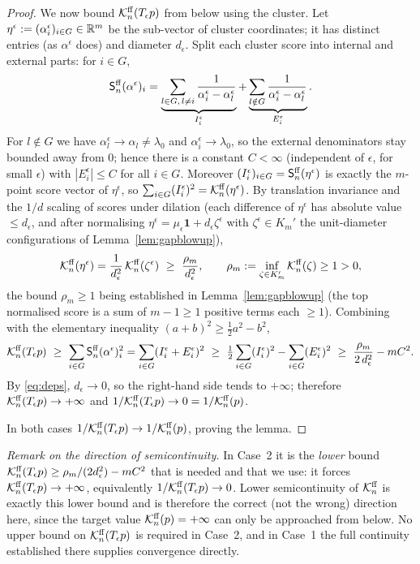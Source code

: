 \begin{proof}
We now bound $\mathcal{K}^{\mathrm{ff}}_n(T_\epsilon p)$ from below using the cluster. Let
$\eta^\epsilon:=(\alpha^\epsilon_i)_{i\in G}\in\mathbb{R}^m$ be the sub-vector of
cluster coordinates; it has distinct entries (as $\alpha^\epsilon$ does) and
diameter $d_\epsilon$. Split each cluster score into internal and external parts:
for $i\in G$,
\[
\mathsf{S}^{\mathrm{ff}}_n(\alpha^\epsilon)_i
=\underbrace{\sum_{l\in G,\,l\ne i}\frac1{\alpha^\epsilon_i-\alpha^\epsilon_l}}_{I^\epsilon_i}
+\underbrace{\sum_{l\notin G}\frac1{\alpha^\epsilon_i-\alpha^\epsilon_l}}_{E^\epsilon_i}.
\]
For $l\notin G$ we have $\alpha^\epsilon_l\to\alpha_l\ne\lambda_0$ and
$\alpha^\epsilon_i\to\lambda_0$, so the external denominators stay bounded away from
$0$; hence there is a constant $C<\infty$ (independent of $\epsilon$, for small
$\epsilon$) with $|E^\epsilon_i|\le C$ for all $i\in G$. Moreover
$(I^\epsilon_i)_{i\in G}=\mathsf{S}^{\mathrm{ff}}_n(\eta^\epsilon)$ is exactly the $m$-point score
vector of $\eta^\epsilon$, so $\sum_{i\in G}(I^\epsilon_i)^2=\mathcal{K}^{\mathrm{ff}}_n(\eta^\epsilon)$.
By translation invariance and the $1/d$ scaling of scores under dilation (each
difference of $\eta^\epsilon$ has absolute value $\le d_\epsilon$, and after
normalising $\eta^\epsilon=\mu_\epsilon\mathbf1+d_\epsilon\zeta^\epsilon$ with
$\zeta^\epsilon\in K_m'$ the unit-diameter configurations of
Lemma~\ref{lem:gapblowup}),
\[
\mathcal{K}^{\mathrm{ff}}_n(\eta^\epsilon)=\frac{1}{d_\epsilon^2}\,\mathcal{K}^{\mathrm{ff}}_n(\zeta^\epsilon)
\ \ge\ \frac{\rho_m}{d_\epsilon^2},\qquad \rho_m:=\inf_{\zeta\in K_m'}\mathcal{K}^{\mathrm{ff}}_n(\zeta)\ge1>0,
\]
the bound $\rho_m\ge1$ being established in Lemma~\ref{lem:gapblowup} (the top
normalised score is a sum of $m-1\ge1$ positive terms each $\ge1$). Combining with
the elementary inequality $(a+b)^2\ge\tfrac12a^2-b^2$,
\[
\mathcal{K}^{\mathrm{ff}}_n(T_\epsilon p)\ \ge\ \sum_{i\in G}\mathsf{S}^{\mathrm{ff}}_n(\alpha^\epsilon)_i^2
=\sum_{i\in G}(I^\epsilon_i+E^\epsilon_i)^2
\ \ge\ \tfrac12\sum_{i\in G}(I^\epsilon_i)^2-\sum_{i\in G}(E^\epsilon_i)^2
\ \ge\ \frac{\rho_m}{2\,d_\epsilon^2}-mC^2 .
\]
By \eqref{eq:deps}, $d_\epsilon\to0$, so the right-hand side tends to $+\infty$;
therefore $\mathcal{K}^{\mathrm{ff}}_n(T_\epsilon p)\to+\infty$ and
$1/\mathcal{K}^{\mathrm{ff}}_n(T_\epsilon p)\to0=1/\mathcal{K}^{\mathrm{ff}}_n(p)$.

\smallskip
In both cases $1/\mathcal{K}^{\mathrm{ff}}_n(T_\epsilon p)\to1/\mathcal{K}^{\mathrm{ff}}_n(p)$, proving the lemma.
\end{proof}

\noindent\emph{Remark on the direction of semicontinuity.} In Case~2 it is the
\emph{lower} bound $\mathcal{K}^{\mathrm{ff}}_n(T_\epsilon p)\ge\rho_m/(2d_\epsilon^2)-mC^2$ that is
needed and that we use: it forces $\mathcal{K}^{\mathrm{ff}}_n(T_\epsilon p)\to+\infty$, equivalently
$1/\mathcal{K}^{\mathrm{ff}}_n(T_\epsilon p)\to0$. Lower semicontinuity of $\mathcal{K}^{\mathrm{ff}}_n$ is exactly
this lower bound and is therefore the correct (not the wrong) direction here, since
the target value $\mathcal{K}^{\mathrm{ff}}_n(p)=+\infty$ can only be approached from below. No
upper bound on $\mathcal{K}^{\mathrm{ff}}_n(T_\epsilon p)$ is required in Case~2, and in Case~1 the
full continuity established there supplies convergence directly.

